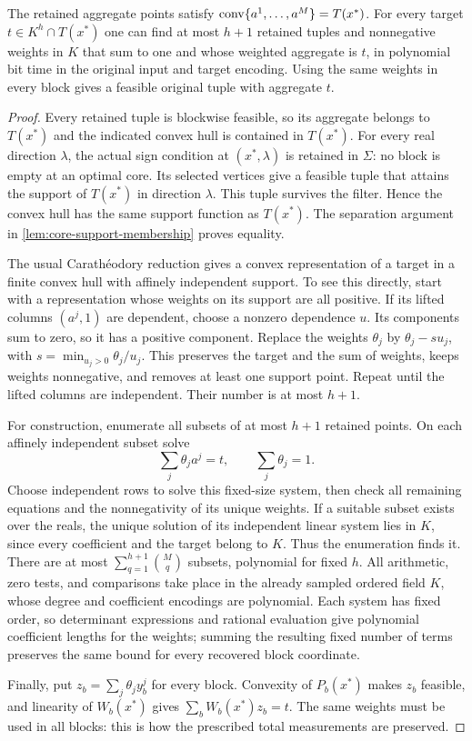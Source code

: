 \begin{lemma}
\label{lem:core-recovery}
The retained aggregate points satisfy
$\operatorname{conv}\{a^1,\ldots,a^M\}=T(x^*)$. For every target $t\in K^h\cap T(x^*)$
one can find at most $h+1$ retained tuples and nonnegative weights in $K$
that sum to one and whose weighted aggregate is $t$, in polynomial bit
time in the original input and target encoding. Using the same weights
in every block gives a feasible original tuple with aggregate $t$.
\end{lemma}
\begin{proof}
Every retained tuple is blockwise feasible, so its aggregate belongs to
$T(x^*)$ and the indicated convex hull is contained in $T(x^*)$.
For every real direction $\lambda$, the actual sign condition at
$(x^*,\lambda)$ is retained in $\Sigma$: no block is empty at an
optimal core. Its selected vertices give a feasible tuple that attains
the support of $T(x^*)$ in direction $\lambda$. This tuple survives
the filter. Hence the convex hull has the same support function as
$T(x^*)$. The separation argument in \cref{lem:core-support-membership}
proves equality.

The usual Carath\'eodory reduction gives a convex representation of
a target in a finite convex hull with affinely independent support.
To see this directly, start with a representation whose weights on its
support are all positive. If its lifted
columns $(a^j,1)$ are dependent, choose a nonzero dependence $u$.
Its components sum to zero, so it has a positive component. Replace
the weights $\theta_j$ by $\theta_j-su_j$, with
$s=\min_{u_j>0}\theta_j/u_j$. This preserves the target and the sum
of weights, keeps weights nonnegative, and removes at least one support
point. Repeat until the lifted columns are independent. Their number
is at most $h+1$.

For construction, enumerate all subsets of at most $h+1$ retained
points. On each affinely independent subset solve
\[
          \sum_j\theta_j a^j=t,\qquad \sum_j\theta_j=1.
\]
Choose independent rows to solve this fixed-size system, then check
all remaining equations and the nonnegativity of its unique weights.
If a suitable subset exists over the reals, the unique solution of its
independent linear system lies in $K$, since every coefficient and the
target belong to $K$. Thus the enumeration finds it. There are at most
$\sum_{q=1}^{h+1}\binom Mq$ subsets, polynomial for fixed $h$.
All arithmetic, zero tests, and comparisons take place in the already
sampled ordered field $K$, whose degree and coefficient encodings are
polynomial. Each system has fixed order, so determinant expressions
and rational evaluation give polynomial coefficient lengths for the
weights; summing the resulting fixed number of terms preserves the
same bound for every recovered block coordinate.

Finally, put $z_b=\sum_j\theta_j y_b^j$ for every block. Convexity
of $P_b(x^*)$ makes $z_b$ feasible, and linearity of $W_b(x^*)$ gives
$\sum_bW_b(x^*)z_b=t$. The same weights must be used in all blocks:
this is how the prescribed total measurements are preserved.
\end{proof}

